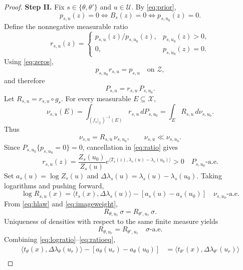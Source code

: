 \documentclass[11pt,a4paper]{article}
\newcommand{\Zset}{\mathcal Z}
\newcommand{\Xset}{\mathcal X}
\newcommand{\Uset}{\mathcal U}
\newcommand{\aev}{\text{-a.e.}}
\newcommand{\ip}[2]{\langle #1,#2\rangle}
\begin{document}
\begin{proof}
\medskip
\noindent\textbf{Step II.}
Fix $s\in\{\theta,\theta'\}$ and $u\in\Uset$. By \eqref{eq:prior},
\begin{equation}
 p_{s,u}(z)=0\iff B_s(z)=0\iff p_{s,u_0}(z)=0. \label{eq:zeros}
\end{equation}
Define the nonnegative measurable ratio
\begin{equation}
 r_{s,u}(z)=
 \begin{cases}
 p_{s,u}(z)/p_{s,u_0}(z),&p_{s,u_0}(z)>0,\\
 0,&p_{s,u_0}(z)=0.
 \end{cases} \label{eq:ratio}
\end{equation}
Using \eqref{eq:zeros},
\begin{equation}
 p_{s,u_0}r_{s,u}=p_{s,u}\quad\text{on }\Zset, \label{eq:densityproduct}
\end{equation}
and therefore
\begin{equation}
 P_{s,u}=r_{s,u}\,P_{s,u_0}. \label{eq:latentweight}
\end{equation}
Let $R_{s,u}=r_{s,u}\circ g_s$. For every measurable $E\subseteq\Xset$,
\[
 \nu_{s,u}(E)
 =\int_{(f_s|_{\Zset})^{-1}(E)}r_{s,u}\,dP_{s,u_0}
 =\int_E R_{s,u}\,d\nu_{s,u_0}.
\]
Thus
\begin{equation}
 \nu_{s,u}=R_{s,u}\,\nu_{s,u_0},\qquad
 \nu_{s,u}\ll\nu_{s,u_0}. \label{eq:imageweight}
\end{equation}
Since $P_{s,u_0}\{p_{s,u_0}=0\}=0$, cancellation in \eqref{eq:ratio} gives
\[
 r_{s,u}(z)=\frac{Z_s(u_0)}{Z_s(u)}
 e^{\ip{T_s(z)}{\lambda_s(u)-\lambda_s(u_0)}}>0
 \quad P_{s,u_0}\aev
\]
Set $a_s(u)=\log Z_s(u)$ and
$\Delta\lambda_s(u)=\lambda_s(u)-\lambda_s(u_0)$. Taking logarithms and
pushing forward,
\begin{equation}
 \log R_{s,u}(x)=\ip{t_s(x)}{\Delta\lambda_s(u)}
 -[a_s(u)-a_s(u_0)]\quad\nu_{s,u_0}\aev \label{eq:logratio}
\end{equation}
From \eqref{eq:hlaw} and \eqref{eq:imageweight},
\[
 R_{\theta,u_r}\,\sigma=R_{\theta',u_r}\,\sigma.
\]
Uniqueness of densities with respect to the same finite measure yields
\begin{equation}
 R_{\theta,u_r}=R_{\theta',u_r}\quad\sigma\aev \label{eq:ratioeq}
\end{equation}
Combining \eqref{eq:logratio}--\eqref{eq:ratioeq},
\begin{align}
 \ip{t_\theta(x)}{\Delta\lambda_\theta(u_r)}
 -[a_\theta(u_r)-a_\theta(u_0)]
 &=\ip{t_{\theta'}(x)}{\Delta\lambda_{\theta'}(u_r)}\nonumber\\

\end{align}
\end{proof}
\end{document}
